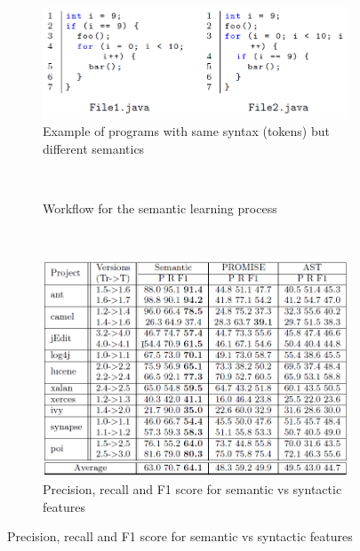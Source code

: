 \documentclass{article}
\begin{document}
 \begin{figure}[H]
     \begin{subfigure}{1\textwidth}
         \centering
         \includegraphics[scale=0.5]{./src/deeplearning_example.png}
         \caption{Example of programs with same syntax (tokens) but different semantics}\label{deeplearning:example}
     \end{subfigure}\\
     \begin{subfigure}{\textwidth}
         \centering
         \caption{Workflow for the semantic learning process}\label{deeplearning:workflow}
     \end{subfigure}\\
     \begin{subfigure}{1\textwidth}
         \centering
         \includegraphics[scale=0.4]{./src/deeplearning_results.png}
         \caption{Precision, recall and F1 score for semantic vs syntactic features}\label{deeplearning:results}
     \end{subfigure}
 \end{figure}
\end{document}
